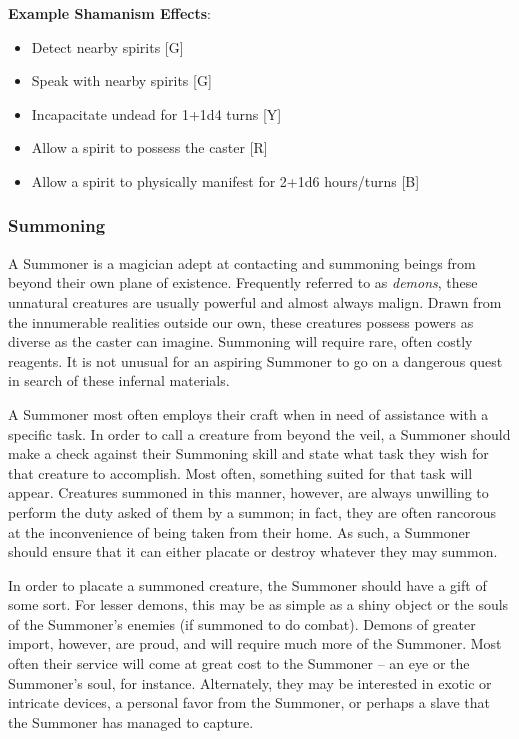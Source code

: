 \documentclass[oneside]{book}
\begin{document}
\begin{multicols}{2}
\textbf{Example Shamanism Effects}: 
	\begin{itemize}
		\setlength{\itemsep}{0cm}%
  		\setlength{\parskip}{0cm}%
		\item{ \small Detect nearby spirits [G]}
		\item{ \small Speak with nearby spirits [G]}
		\item{ \small Incapacitate undead for 1+1d4 turns [Y]}
		\item{ \small Allow a spirit to possess the caster [R]}
		\item{ \small Allow a spirit to physically manifest for 2+1d6 hours/turns [B]}
	\end{itemize}

\subsubsection{Summoning}
A Summoner is a magician adept at contacting and summoning beings from beyond their own plane of existence. Frequently referred to as \emph{demons}, these unnatural creatures are usually powerful and almost always malign. Drawn from the innumerable realities outside our own, these creatures possess powers as diverse as the caster can imagine. Summoning will require rare, often costly reagents. It is not unusual for an aspiring Summoner to go on a dangerous quest in search of these infernal materials.

A Summoner most often employs their craft when in need of assistance with a specific task. In order to call a creature from beyond the veil, a Summoner should make a check against their Summoning skill and state what task they wish for that creature to accomplish. Most often, something suited for that task will appear. Creatures summoned in this manner, however, are always unwilling to perform the duty asked of them by a summon; in fact, they are often rancorous at the inconvenience of being taken from their home. As such, a Summoner should ensure that it can either placate or destroy whatever they may summon. 

In order to placate a summoned creature, the Summoner should have a gift of some sort. For lesser demons, this may be as simple as a shiny object or the souls of the Summoner's enemies (if summoned to do combat). Demons of greater import, however, are proud, and will require much more of the Summoner. Most often their service will come at great cost to the Summoner -- an eye or the Summoner's soul, for instance. Alternately, they may be interested in exotic or intricate devices, a personal favor from the Summoner, or perhaps a slave that the Summoner has managed to capture. 


\end{multicols}
\end{document}

